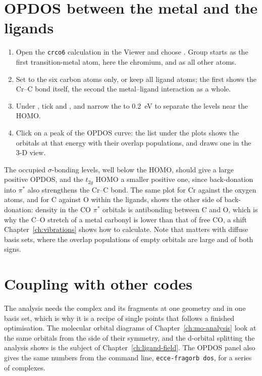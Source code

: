 \section{OPDOS between the metal and the ligands}
\begin{enumerate}
	\item Open the \texttt{crco6} calculation in the Viewer and choose . Group  starts as the first transition-metal atom, here the chromium, and  as all other atoms.
	\item Set  to the six carbon atoms only, or keep all ligand atoms; the first shows the Cr--C bond itself, the second the metal--ligand interaction as a whole.
	\item Under , tick  and , and narrow the  to 0.2~eV to separate the levels near the HOMO.
	\item Click on a peak of the OPDOS curve: the list under the plots shows the orbitals at that energy with their overlap populations, and  draws one in the 3-D view.
\end{enumerate}

The occupied $\sigma$-bonding levels, well below the HOMO, should give a large positive OPDOS, and the $t_{2g}$ HOMO a smaller positive one, since back-donation into $\pi^*$ also strengthens the Cr--C bond. The same plot for Cr against the oxygen atoms, and for C against O within the ligands, shows the other side of back-donation: density in the CO $\pi^*$ orbitals is antibonding between C and O, which is why the C--O stretch of a metal carbonyl is lower than that of free CO, a shift Chapter~\ref{ch:vibrations} shows how to calculate. Note that  matters with diffuse basis sets, where the overlap populations of empty orbitals are large and of both signs.

\section{Coupling with other codes}
The analysis needs the complex and its fragments at one geometry and in one basis set, which is why it is a recipe of single points that follows a finished optimisation. The molecular orbital diagrams of Chapter~\ref{ch:mo-analysis} look at the same orbitals from the side of their symmetry, and the d-orbital splitting the analysis shows is the subject of Chapter~\ref{ch:ligand-field}. The OPDOS panel also gives the same numbers from the command line, \texttt{ecce-fragorb dos}, for a series of complexes.
